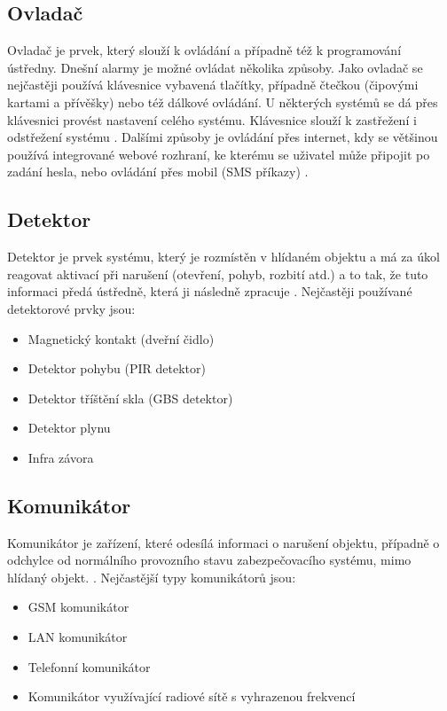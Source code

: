 \documentclass[FM,DP]{tulthesis}  %
\begin{document}
\subsection{Ovladač}
Ovladač je prvek, který slouží k ovládání a případně též k programování ústředny. Dnešní alarmy je možné ovládat několika způsoby. Jako ovladač se nejčastěji používá klávesnice vybavená tlačítky, případně čtečkou (čipovými kartami a přívěšky) nebo též dálkové ovládání. U některých systémů se dá přes klávesnici provést nastavení celého systému. Klávesnice slouží k zastřežení i odstřežení systému \cite{Electronic security signalisation}. Dalšími způsoby je ovládání přes internet, kdy se většinou používá integrované webové rozhraní, ke kterému se uživatel může připojit po zadání hesla, nebo ovládání přes mobil (SMS příkazy) \cite{Bachelor thesis}.

\subsection{Detektor}
Detektor je prvek systému, který je rozmístěn v hlídaném objektu a má za úkol reagovat aktivací při narušení (otevření, pohyb, rozbití atd.) a to tak, že tuto informaci předá ústředně, která ji následně zpracuje \cite{Electronic security signalisation}. Nejčastěji používané detektorové prvky jsou:

\begin{itemize}
\item Magnetický kontakt (dveřní čidlo)
\item Detektor pohybu (PIR detektor)
\item Detektor tříštění skla (GBS detektor)
\item Detektor plynu
\item Infra závora
\end{itemize}

\subsection{Komunikátor}
Komunikátor je zařízení, které odesílá informaci o narušení objektu, případně o odchylce od normálního provozního stavu zabezpečovacího systému, mimo  hlídaný objekt. \cite{Electronic security signalisation}. Nejčastější typy komunikátorů jsou:

\begin{itemize}
\item GSM komunikátor
\item LAN komunikátor
\item Telefonní komunikátor
\item Komunikátor využívající radiové sítě s vyhrazenou frekvencí
\end{itemize}
\end{document}
